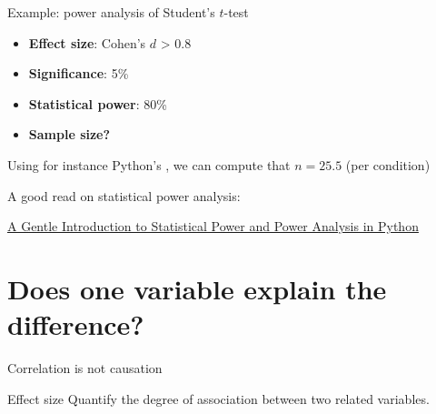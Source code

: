 \documentclass[compress]{beamer}
\begin{document}
\begin{frame}{Example: power analysis of Student's $t$-test}

    \begin{itemize}
        \item \textbf{Effect size}: Cohen's $d$ > 0.8
        \item \textbf{Significance}: 5\%
        \item \textbf{Statistical power}: 80\%
        \item \textbf{Sample size?}

    \end{itemize}

    \pause

    Using for instance Python's ,
    we can compute that $n=25.5$ (per condition)

    \pause

    A good read on statistical power analysis:

    \href{https://machinelearningmastery.com/statistical-power-and-power-analysis-in-python/}{A
    Gentle Introduction to Statistical Power and Power Analysis in Python}
\end{frame}

\section{Does one variable explain the difference?}

\begin{frame}{Correlation is not causation}
\end{frame}

\begin{frame}{Effect size}
    Quantify the degree of association between two related variables.
\end{frame}
\end{document}
